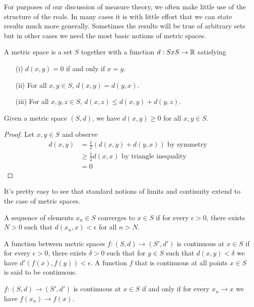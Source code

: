 For purposes of our discussion of measure theory, we often make little
use of the structure of the reals.  In many cases it is with little
effort that we can state results much more generally.  Sometimes the
results will be true of arbitrary sets but in other cases we need the
most basic notions of metric spaces.
\begin{defn}A metric space is a set $S$ together with a function
  $d:SxS \to \mathbb{R}$ satisfying
\begin{itemize}
\item[(i)]$d(x,y) = 0$ if and only if $x=y$.
\item[(ii)]For all $x,y \in S$, $d(x,y) = d(y,x)$.
\item[(iii)]For all $x,y,z \in S$, $d(x,z) \leq d(x,y) + d(y,z)$.
\end{itemize}
\end{defn}
\begin{lem}\label{MetricSpaceIsPseudometric}Given a metric space $(S,d)$, we have $d(x,y) \geq 0$ for all
  $x,y \in S$.
\end{lem}
\begin{proof}
Let $x,y \in S$ and observe 
\begin{align*}
d(x,y) &= \frac{1}{2} (d(x,y) + d(y,x)) \textrm { by symmetry} \\
&\geq \frac{1}{2} d(x,x) \textrm{ by triangle inequality} \\
&= 0
\end{align*}
\end{proof}
 It's pretty easy to see that standard notions of limits and continuity
extend to the case of metric spaces.
\begin{defn}A sequence of elements $x_n \in S$ converges to $x \in S$
  if for every $\epsilon > 0$, there exists $N > 0$ such that
  $d(x_n,x) < \epsilon$ for all $n > N$.
\end{defn}
\begin{defn}A function between metric spaces $f : (S,d) \to (S', d')$
  is continuous at $x \in S$ if for every $\epsilon>0$, there exists
  $\delta > 0$ such that for $y\in S$ such that $d(x,y)<\delta$ we
  have $d'(f(x),f(y)) < \epsilon$.  A function $f$ that is continuous
  at all points $x \in S$ is said to be continuous.
\end{defn}
\begin{lem}$f : (S,d) \to (S', d')$ is continuous at $x \in S$ if and only if for
  every $x_n \to x$ we have $f(x_n) \to f(x)$.
\end{lem}

